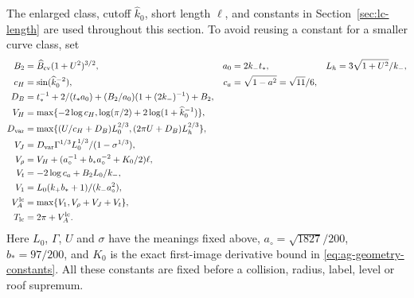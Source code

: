 The enlarged class, cutoff $\widehat k_0$, short length $\ell$, and
constants in Section~\ref{sec:lc-length} are used throughout this
section.  To avoid reusing a constant for a smaller curve class, set
\begin{align}
 B_2&=\widehat B_{\rm cv}(1+U^2)^{3/2},&
 a_0&=2k_-t_*,&
 L_h&=3\sqrt{1+U^2}/k_-,\notag\\
 c_H&=\sin(\widehat k_0^{-2}),&
 c_a&=\sqrt{1-a^2}=\sqrt{11}/6,\notag\\
 D_B&=t_*^{-1}+2/(t_*a_0)
              +(B_2/a_0)(1+(2k_-)^{-1})+B_2,\notag\\
 V_H&=\max\{-2\log c_H,
             \log(\pi/2)+2\log(1+\widehat k_0^{-1})\},
                                                   \label{eq:lc-turn-one}\\
 D_{\rm var}&=\max\{(U/c_H+D_B)L_0^{2/3},
                         (2\pi U+D_B)L_h^{2/3}\},\notag\\
 V_J&=D_{\rm var}\Gamma^{1/3}L_0^{1/3}/(1-\sigma^{1/3}),\notag\\
 V_\rho&=V_H+(a_\circ^{-1}+b_*a_\circ^{-2}+K_0/2)\ell,\notag\\
 V_t&=-2\log c_a+B_2L_0/k_-,\notag\\
 V_1&=L_0(k_+b_*+1)/(k_-a_\circ^2),\notag\\
 V_A^{\rm lc}&=\max\{V_1,V_\rho+V_J+V_t\},\notag\\
 T_{\rm lc}&=2\pi+V_A^{\rm lc}.
                                                   \label{eq:lc-turn-two}
\end{align}
Here $L_0$, $\Gamma$, $U$ and $\sigma$ have the meanings fixed above,
$a_\circ=\sqrt{1827}/200$, $b_*=97/200$, and $K_0$ is the exact
first-image derivative bound in \eqref{eq:ag-geometry-constants}.
All these constants are fixed before a collision, radius, label, level
or roof supremum.

